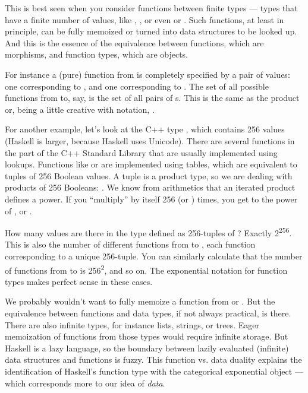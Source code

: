 This is best seen when you consider functions between finite types ---
types that have a finite number of values, like ,
, or even  or . Such functions,
at least in principle, can be fully memoized or turned into data
structures to be looked up. And this is the essence of the equivalence
between functions, which are morphisms, and function types, which are
objects.

For instance a (pure) function from  is completely
specified by a pair of values: one corresponding to , and
one corresponding to . The set of all possible functions
from  to, say,  is the set of all pairs of
s. This is the same as the product  or,
being a little creative with notation, .

For another example, let's look at the C++ type , which
contains 256 values (Haskell  is larger, because Haskell
uses Unicode). There are several functions in the \code{} part of the
C++ Standard Library that are usually implemented using lookups.
Functions like  or  are implemented
using tables, which are equivalent to tuples of 256 Boolean values. A
tuple is a product type, so we are dealing with products of 256
Booleans: . We know from
arithmetics that an iterated product defines a power. If you
``multiply''  by itself 256 (or ) times, you
get  to the power of , or .

How many values are there in the type defined as 256-tuples of
? Exactly 2\textsuperscript{256}. This is also the number
of different functions from  to , each
function corresponding to a unique 256-tuple. You can similarly
calculate that the number of functions from  to
 is 256\textsuperscript{2}, and so on. The exponential
notation for function types makes perfect sense in these cases.

We probably wouldn't want to fully memoize a function from 
or . But the equivalence between functions and data
types, if not always practical, is there. There are also infinite types,
for instance lists, strings, or trees. Eager memoization of functions
from those types would require infinite storage. But Haskell is a lazy
language, so the boundary between lazily evaluated (infinite) data
structures and functions is fuzzy. This function vs. data duality
explains the identification of Haskell's function type with the
categorical exponential object --- which corresponds more to our idea of
\emph{data}.

